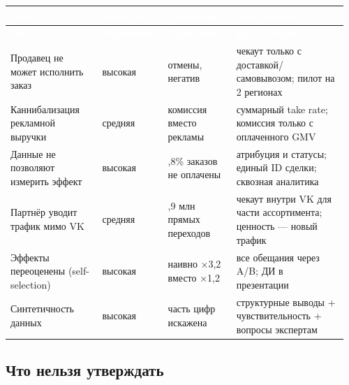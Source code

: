 \documentclass[10pt,a4paper]{article}
\begin{document}
\begingroup
\small
\setlength{\tabcolsep}{3pt}
\renewcommand{\arraystretch}{1.12}
\begin{longtable}{@{}>{\raggedright\arraybackslash}p{0.2913\linewidth}>{\raggedright\arraybackslash}p{0.0890\linewidth}>{\raggedright\arraybackslash}p{0.2104\linewidth}>{\raggedright\arraybackslash}p{0.3723\linewidth}@{}}
\rowcolor{blue}
\textcolor{white}{\textbf{Риск}} & \textcolor{white}{\textbf{Вероятность}} & \textcolor{white}{\textbf{Проявление}} & \textcolor{white}{\textbf{Как снимаем}} \\
\endfirsthead
\rowcolor{blue}
\textcolor{white}{\textbf{Риск}} & \textcolor{white}{\textbf{Вероятность}} & \textcolor{white}{\textbf{Проявление}} & \textcolor{white}{\textbf{Как снимаем}} \\
\endhead
\hline
Продавец не может исполнить заказ & высокая & отмены, негатив & чекаут только с доставкой/самовывозом; пилот на 2 регионах \\
Каннибализация рекламной выручки & средняя & комиссия вместо рекламы & суммарный take rate; комиссия только с оплаченного GMV \\
Данные не позволяют измерить эффект & высокая & 98,8\% заказов не оплачены & атрибуция и статусы; единый ID сделки; сквозная аналитика \\
Партнёр уводит трафик мимо VK & средняя & 106,9 млн прямых переходов & чекаут внутри VK для части ассортимента; ценность — новый трафик \\
Эффекты переоценены (self-selection) & высокая & наивно ×3,2 вместо ×1,2 & все обещания через A/B; ДИ в презентации \\
Синтетичность данных & высокая & часть цифр искажена & структурные выводы + чувствительность + вопросы экспертам \\
\hline
\end{longtable}
\endgroup
\vspace{4pt}

\subsection{Что нельзя утверждать}
\end{document}
